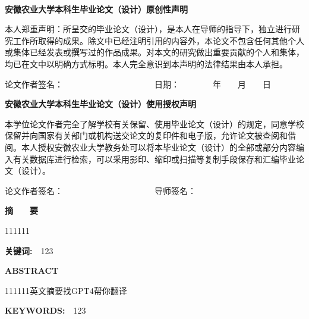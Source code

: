 \documentclass[UTF8,a4paper,12pt]{ctexart}
\begin{document}
	\thispagestyle{empty}
	\newpage　
	\vspace{1cm} \par \textbf{\fontsize{18pt}{\baselineskip}\heiti 安徽农业大学本科生毕业论文（设计）原创性声明}
	\vspace{1cm} \par 本人郑重声明：所呈交的毕业论文（设计），是本人在导师的指导下，独立进行研究工作所取得的成果。除文中已经注明引用的内容外，本论文不包含任何其他个人或集体已经发表或撰写过的作品成果。对本文的研究做出重要贡献的个人和集体，均已在文中以明确方式标明。本人完全意识到本声明的法律结果由本人承担。
	\vspace{1cm} \par 论文作者签名：　　　　　　　　　　　日期：　　　　年　　月　　日
	\vspace{6cm} \par \textbf{\fontsize{18pt}{\baselineskip}\heiti  安徽农业大学本科生毕业论文（设计）使用授权声明}
	\vspace{1cm} \par 本学位论文作者完全了解学校有关保留、使用毕业论文（设计）的规定，同意学校保留并向国家有关部门或机构送交论文的复印件和电子版，允许论文被查阅和借阅。本人授权安徽农业大学教务处可以将本毕业论文（设计）的全部或部分内容编入有关数据库进行检索，可以采用影印、缩印或扫描等复制手段保存和汇编毕业论文（设计）。
	\vspace{1cm} \par 论文作者签名：　　　　　　　　　　　导师签名：
	\thispagestyle{empty}
	
	\newpage
	
	\begin{spacing}{1.4}
	\tableofcontents
	
	\end{spacing}
	\thispagestyle{fancy}
	\fancyfoot{}
	\newpage
	\fancyfoot[C]{\thepage} 
	 
	\centerline{\textbf{\fontsize{16pt}{\baselineskip}\heiti 摘　　要}}
	\vspace{0.4cm}
	111111
	\vspace{0.2cm}
	\par \textbf{\fontsize{14pt}{\baselineskip}\heiti 关键词:　}123
	\setcounter{page}{1}
	\newpage
	\centerline{\textbf{\fontsize{16pt}{\baselineskip}ABSTRACT}}
	\vspace{0.4cm}
	111111英文摘要找GPT4帮你翻译
	\vspace{0.4cm}
	\par \textbf{\fontsize{14pt}{\baselineskip}KEYWORDS:　}123
	\newpage
	\setcounter{page}{1}
\end{document}
